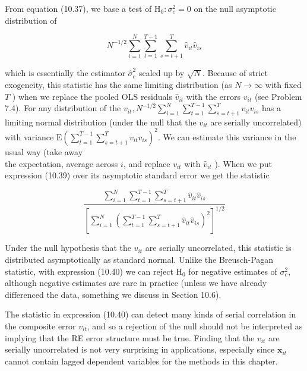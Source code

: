 \documentclass[10pt]{article}
\begin{document}
From equation (10.37), we base a test of $\mathrm{H}_{0}: \sigma_{c}^{2}=0$ on the null asymptotic distribution of


\begin{equation*}
N^{-1 / 2} \sum_{i=1}^{N} \sum_{t=1}^{T-1} \sum_{s=t+1}^{T} \hat{v}_{i t} \hat{v}_{i s} \tag{10.39}
\end{equation*}


which is essentially the estimator $\hat{\sigma}_{c}^{2}$ scaled up by $\sqrt{N}$. Because of strict exogeneity, this statistic has the same limiting distribution (as $N \rightarrow \infty$ with fixed $T$ ) when we replace the pooled OLS residuals $\hat{v}_{i t}$ with the errors $v_{i t}$ (see Problem 7.4). For any distribution of the $v_{i t}, N^{-1 / 2} \sum_{i=1}^{N} \sum_{t=1}^{T-1} \sum_{s=t+1}^{T} v_{i t} v_{i s}$ has a limiting normal distribution (under the null that the $v_{i t}$ are serially uncorrelated) with variance $\mathrm{E}\left(\sum_{t=1}^{T-1} \sum_{s=t+1}^{T} v_{i t} v_{i s}\right)^{2}$. We can estimate this variance in the usual way (take away\\
the expectation, average across $i$, and replace $v_{i t}$ with $\hat{v}_{i t}$ ). When we put expression (10.39) over its asymptotic standard error we get the statistic


\begin{equation*}
\frac{\sum_{i=1}^{N} \sum_{t=1}^{T-1} \sum_{s=t+1}^{T} \hat{v}_{i t} \hat{v}_{i s}}{\left[\sum_{i=1}^{N}\left(\sum_{t=1}^{T-1} \sum_{s=t+1}^{T} \hat{v}_{i t} \hat{v}_{i s}\right)^{2}\right]^{1 / 2}} \tag{10.40}
\end{equation*}


Under the null hypothesis that the $v_{i t}$ are serially uncorrelated, this statistic is distributed asymptotically as standard normal. Unlike the Breusch-Pagan statistic, with expression (10.40) we can reject $\mathrm{H}_{0}$ for negative estimates of $\sigma_{c}^{2}$, although negative estimates are rare in practice (unless we have already differenced the data, something we discuss in Section 10.6).

The statistic in expression (10.40) can detect many kinds of serial correlation in the composite error $v_{i t}$, and so a rejection of the null should not be interpreted as implying that the RE error structure must be true. Finding that the $v_{i t}$ are serially uncorrelated is not very surprising in applications, especially since $\mathbf{x}_{i t}$ cannot contain lagged dependent variables for the methods in this chapter.
\end{document}
